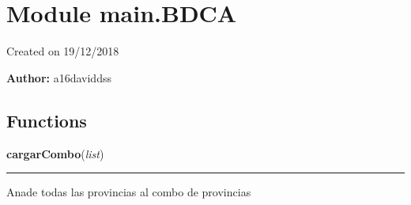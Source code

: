 %
%
%


\section{Module main.BDCA}

    \label{main:BDCA}
Created on 19/12/2018

\textbf{Author:} a16daviddss





  \subsection{Functions}

    \label{main:BDCA:cargarCombo}

    \vspace{0.5ex}

\hspace{.8\funcindent}\begin{boxedminipage}{\funcwidth}

    \raggedright \textbf{cargarCombo}(\textit{list})

    \vspace{-1.5ex}

    \rule{\textwidth}{0.5\fboxrule}
\setlength{\parskip}{2ex}
    Anade todas las provincias al combo de provincias

\setlength{\parskip}{1ex}
    \end{boxedminipage}

    \label{main:BDCA:cargarmun}

    \vspace{0.5ex}

